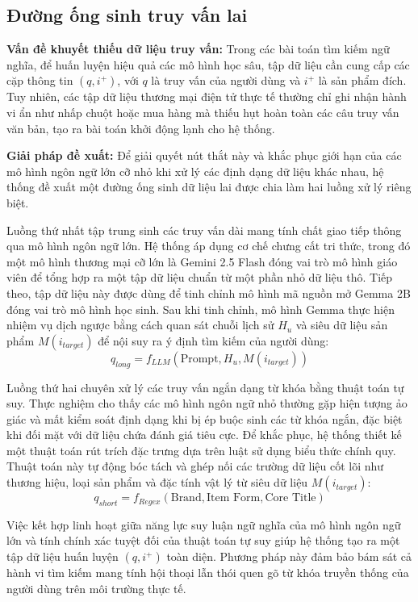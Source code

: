 \subsection{Đường ống sinh truy vấn lai}

\noindent \textbf{Vấn đề khuyết thiếu dữ liệu truy vấn:} 
Trong các bài toán tìm kiếm ngữ nghĩa, để huấn luyện hiệu quả các mô hình học sâu, tập dữ liệu cần cung cấp các cặp thông tin $(q, i^+)$, với $q$ là truy vấn của người dùng và $i^+$ là sản phẩm đích. Tuy nhiên, các tập dữ liệu thương mại điện tử thực tế thường chỉ ghi nhận hành vi ẩn như nhấp chuột hoặc mua hàng mà thiếu hụt hoàn toàn các câu truy vấn văn bản, tạo ra bài toán khởi động lạnh cho hệ thống.

\noindent \textbf{Giải pháp đề xuất:} 
Để giải quyết nút thắt này và khắc phục giới hạn của các mô hình ngôn ngữ lớn cỡ nhỏ khi xử lý các định dạng dữ liệu khác nhau, hệ thống đề xuất một đường ống sinh dữ liệu lai được chia làm hai luồng xử lý riêng biệt.

Luồng thứ nhất tập trung sinh các truy vấn dài mang tính chất giao tiếp thông qua mô hình ngôn ngữ lớn. Hệ thống áp dụng cơ chế chưng cất tri thức, trong đó một mô hình thương mại cỡ lớn là Gemini 2.5 Flash đóng vai trò mô hình giáo viên để tổng hợp ra một tập dữ liệu chuẩn từ một phần nhỏ dữ liệu thô. Tiếp theo, tập dữ liệu này được dùng để tinh chỉnh mô hình mã nguồn mở Gemma 2B đóng vai trò mô hình học sinh. Sau khi tinh chỉnh, mô hình Gemma thực hiện nhiệm vụ dịch ngược bằng cách quan sát chuỗi lịch sử $H_u$ và siêu dữ liệu sản phẩm $M(i_{target})$ để nội suy ra ý định tìm kiếm của người dùng:
$$q_{long} = f_{LLM}\left( \text{Prompt}, H_u, M(i_{target}) \right)$$

Luồng thứ hai chuyên xử lý các truy vấn ngắn dạng từ khóa bằng thuật toán tự suy. Thực nghiệm cho thấy các mô hình ngôn ngữ nhỏ thường gặp hiện tượng ảo giác và mất kiểm soát định dạng khi bị ép buộc sinh các từ khóa ngắn, đặc biệt khi đối mặt với dữ liệu chứa đánh giá tiêu cực. Để khắc phục, hệ thống thiết kế một thuật toán rút trích đặc trưng dựa trên luật sử dụng biểu thức chính quy. Thuật toán này tự động bóc tách và ghép nối các trường dữ liệu cốt lõi như thương hiệu, loại sản phẩm và đặc tính vật lý từ siêu dữ liệu $M(i_{target})$:
$$q_{short} = f_{Regex}\left( \text{Brand}, \text{Item Form}, \text{Core Title} \right)$$

Việc kết hợp linh hoạt giữa năng lực suy luận ngữ nghĩa của mô hình ngôn ngữ lớn và tính chính xác tuyệt đối của thuật toán tự suy giúp hệ thống tạo ra một tập dữ liệu huấn luyện $(q, i^+)$ toàn diện. Phương pháp này đảm bảo bám sát cả hành vi tìm kiếm mang tính hội thoại lẫn thói quen gõ từ khóa truyền thống của người dùng trên môi trường thực tế.

